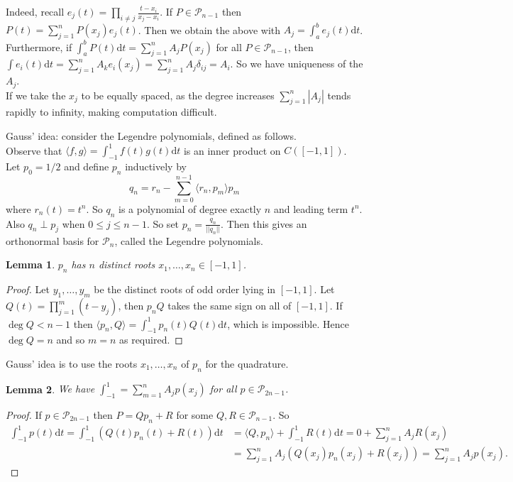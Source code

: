 \documentclass[a4paper, 10pt, twocolumn]{amsart}
\newtheorem*{lemma}{Lemma}
\theoremstyle{definition}
\renewcommand{\cal}[1]{\mathcal{#1}}
\newcommand{\lbr}[1]{\langle #1 \rangle}
\newcommand{\1}{\mathbbm{1}}
\begin{document}
Indeed, recall $e_j(t) = \prod_{i\ne j} \frac{t-x_i}{x_j-x_i}$. If $P \in \cal{P}_{n-1}$ then $P(t) = \sum_{j=1}^n P(x_j)e_j(t)$. Then we obtain the above with $A_j = \int_a^b e_j(t)\mathrm{d}t$. \\

Furthermore, if $\int_a^b P(t)\mathrm{d}t = \sum_{j=1}^n A_j P(x_j)$ for all $P \in \cal{P}_{n-1}$, then $\int e_i(t)\mathrm{d}t = \sum_{j=1}^n A_k e_i(x_j) = \sum_{j=1}^n A_j \delta_{ij} = A_i$. So we have uniqueness of the $A_j$.\\

If we take the $x_j$ to be equally spaced, as the degree increases $\sum_{j=1}^n |A_j|$ tends rapidly to infinity, making computation difficult.




Gauss' idea: consider the Legendre polynomials, defined as follows.\\

Observe that $\lbr{f,g}= \int_{-1}^1 f(t)g(t)\mathrm{d}t$ is an inner product on $C([-1,1])$. Let $p_0 = 1/2$ and define $p_n$ inductively by \[q_n = r_n - \sum_{m=0}^{n-1} \lbr{r_n,p_m}p_m\]
where $r_n(t) = t^n$. So $q_n$ is a polynomial of degree exactly $n$ and leading term $t^n$. Also $q_n \perp p_j$ when $0\le j\le n-1$. So set $p_n = \frac{q_n}{||q_n||}$. Then this gives an orthonormal basis for $\cal{P}_n$, called the Legendre polynomials.

\begin{lemma}
    $p_n$ has $n$ distinct roots $x_1,\ldots,x_n \in [-1,1]$.
\end{lemma}

\begin{proof}
Let $y_1,\ldots,y_m$ be the distinct roots of odd order lying in $[-1,1]$. Let $Q(t) = \prod_{j=1}^m (t-y_j)$, then $p_nQ$ takes the same sign on all of $[-1,1]$. If $\deg{Q} <n-1$ then $\lbr{p_n,Q} = \int_{-1}^1 p_n(t)Q(t)\mathrm{d}t$, which is impossible. Hence $\deg{Q}=n$ and so $m=n$ as required.
\end{proof}

Gauss' idea is to use the roots $x_1,\ldots,x_n$ of $p_n$ for the quadrature.

\begin{lemma}
    We have $\int_{-1}^1 = \sum_{m=1}^n A_jp(x_j)$ for all $p \in \cal{P}_{2n-1}$.
\end{lemma}

\begin{proof}
    If $p \in \cal{P}_{2n-1}$ then $P = Qp_n+R$ for some $Q,R \in \cal{P}_{n-1}$. So \begin{align*}
        \int_{-1}^1 p(t)\mathrm{d}t = \int_{-1}^1 (Q(t)p_n(t)+R(t))\mathrm{d}t &= \lbr{Q,p_n} + \int_{-1}^1 R(t)\mathrm{d}t = 0+\sum_{j=1}^n A_jR(x_j)\\
        &= \sum_{j=1}^n A_j(Q(x_j)p_n(x_j)+R(x_j)) = \sum_{j=1}^n A_jp(x_j).
    \end{align*}
\end{proof}
\end{document}
